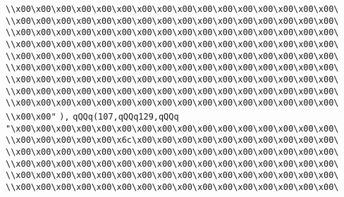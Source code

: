 \verb|\\x00\x00\x00\x00\x00\x00\x00\x00\x00\x00\x00\x00\x00\x00\x00\x00\|\newline
\verb|\\x00\x00\x00\x00\x00\x00\x00\x00\x00\x00\x00\x00\x00\x00\x00\x00\|\newline
\verb|\\x00\x00\x00\x00\x00\x00\x00\x00\x00\x00\x00\x00\x00\x00\x00\x00\|\newline
\verb|\\x00\x00\x00\x00\x00\x00\x00\x00\x00\x00\x00\x00\x00\x00\x00\x00\|\newline
\verb|\\x00\x00\x00\x00\x00\x00\x00\x00\x00\x00\x00\x00\x00\x00\x00\x00\|\newline
\verb|\\x00\x00\x00\x00\x00\x00\x00\x00\x00\x00\x00\x00\x00\x00\x00\x00\|\newline
\verb|\\x00\x00\x00\x00\x00\x00\x00\x00\x00\x00\x00\x00\x00\x00\x00\x00\|\newline
\verb|\\x00\x00\x00\x00\x00\x00\x00\x00\x00\x00\x00\x00\x00\x00\x00\x00\|\newline
\verb|\\x00\x00\x00\x00\x00\x00\x00\x00\x00\x00\x00\x00\x00\x00\x00\x00\|\newline
\verb|\\x00\x00"|\newline
\verb|),|\newline
\verb|qQQq(107,qQQq129,qQQq|\newline
\verb|"\x00\x00\x00\x00\x00\x00\x00\x00\x00\x00\x00\x00\x00\x00\x00\x00\|\newline
\verb|\\x00\x00\x00\x00\x00\x6c\x00\x00\x00\x00\x00\x00\x00\x00\x00\x00\|\newline
\verb|\\x00\x00\x00\x00\x00\x00\x00\x00\x00\x00\x00\x00\x00\x00\x00\x00\|\newline
\verb|\\x00\x00\x00\x00\x00\x00\x00\x00\x00\x00\x00\x00\x00\x00\x00\x00\|\newline
\verb|\\x00\x00\x00\x00\x00\x00\x00\x00\x00\x00\x00\x00\x00\x00\x00\x00\|\newline
\verb|\\x00\x00\x00\x00\x00\x00\x00\x00\x00\x00\x00\x00\x00\x00\x00\x00\|\newline
